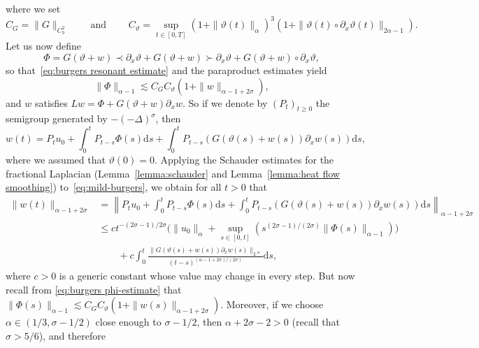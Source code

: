 \documentclass[11pt,a4paper]{article}
\newcommand{\mathd}{\mathrm{d}}
\newcommand{\tmop}[1]{\ensuremath{\operatorname{#1}}}
\theoremstyle{remark}
\begin{document}
where we set
\[
   C_{G} = \| G \|_{C^{2}_{b}} \hspace{2em} \tmop{and} \hspace{2em}  C_{\vartheta} = \sup_{t \in [ 0,T ]} ( 1+ \| \vartheta ( t ) \|_{\alpha} )^{3} ( 1+ \| \vartheta ( t ) \circ \partial_{x} \vartheta ( t ) \|_{2 \alpha -1} ) .
\]
Let us now define
\[
   \Phi =G ( \vartheta +w ) \prec \partial_{x} \vartheta +G ( \vartheta +w ) \succ \partial_{x} \vartheta +G ( \vartheta +w ) \circ \partial_{x} \vartheta ,
\]
so that~{\eqref{eq:burgers resonant estimate}} and the paraproduct estimates yield
\begin{equation}\label{eq:burgers phi-estimate}
   \| \Phi \|_{\alpha -1} \lesssim C_{G}C_{\vartheta} ( 1+ \| w \|_{\alpha -1+2 \sigma} ) ,
\end{equation}
and $w$ satisfies $L w= \Phi +G ( \vartheta +w ) \partial_{x} w$. So if we denote by $( P_{t} )_{t \geqslant 0}$ the semigroup generated by $- (- \Delta )^{\sigma}$, then
\begin{equation}\label{eq:mild-burgers}
  w ( t ) =P_{t} u_{0} + \int_{0}^{t} P_{t-s} \Phi ( s ) \mathd s+ \int_{0}^{t} P_{t-s} ( G ( \vartheta ( s ) +w ( s ) ) \partial_{x} w ( s ) ) \mathd s,
\end{equation}
where we assumed that $\vartheta(0) = 0$. Applying the Schauder estimates for the fractional Laplacian (Lemma~\ref{lemma:schauder} and Lemma~\ref{lemma:heat flow smoothing}) to~{\eqref{eq:mild-burgers}}, we obtain for all $t>0$ that
\begin{align*}
   \| w ( t ) \|_{\alpha -1+2 \sigma} & = \left\| P_{t} u_{0} + \int_{0}^{t} P_{t-s} \Phi ( s ) \mathd s+ \int_{0}^{t} P_{t-s} ( G ( \vartheta ( s ) +w ( s ) ) \partial_{x} w ( s ) ) \mathd s \right\|_{\alpha -1+2 \sigma} \\
   & \leqslant c t^{- ( 2 \sigma -1 ) /2 \sigma} \Big( \| u_{0} \|_{\alpha} + \sup_{s \in [ 0,t ]} ( s^{( 2 \sigma -1 ) / ( 2 \sigma )} \| \Phi ( s )\|_{\alpha -1} ) \Big) \\
   &\qquad +c \int_{0}^{t} \frac{\| G ( \vartheta ( s ) +w ( s ) ) \partial_{x} w ( s ) \|_{L^{\infty}}}{( t-s )^{( \alpha -1+2 \sigma ) / ( 2 \sigma )}} \mathd s,
\end{align*}
where $c>0$ is a generic constant whose value may change in every step. But
now recall from {\eqref{eq:burgers phi-estimate}} that $\| \Phi ( s )\|_{\alpha -1} \lesssim C_{G} C_{\vartheta} ( 1+ \| w ( s ) \|_{\alpha -1+2 \sigma} )$. Moreover, if we choose $\alpha \in ( 1/3, \sigma -1/2 )$ close enough to $\sigma -1/2$, then $\alpha +2 \sigma -2>0$ (recall that $\sigma >5/6$), and therefore
\end{document}
